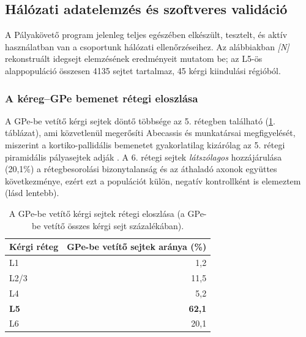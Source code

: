 
\subsection{Hálózati adatelemzés és szoftveres validáció}

A Pályakövető program jelenleg teljes egészében elkészült, tesztelt, és aktív
használatban van a csoportunk hálózati ellenőrzéseihez. Az alábbiakban
\emph{[N]} rekonstruált idegsejt elemzésének eredményeit mutatom be; az L5-ös
alappopuláció összesen 4135 sejtet tartalmaz, 45 kérgi kiindulási régióból.

\subsubsection{A kéreg--GPe bemenet rétegi eloszlása}

A GPe-be vetítő kérgi sejtek döntő többsége az 5. rétegben található
(\ref{tab:retegek}. táblázat), ami közvetlenül megerősíti Abecassis és
munkatársai megfigyelését, miszerint a kortiko-pallidális bemenetet
gyakorlatilag kizárólag az 5. rétegi piramidális pályasejtek adják
\cite{abecassis2020}. A 6. rétegi sejtek \emph{látszólagos} hozzájárulása
(20,1\%) a rétegbesorolási bizonytalanság és az áthaladó axonok együttes
következménye, ezért ezt a populációt külön, negatív kontrollként is
elemeztem (lásd lentebb).

\begin{table}[ht]
\centering
\caption{A GPe-be vetítő kérgi sejtek rétegi eloszlása (a GPe-be vetítő
összes kérgi sejt százalékában).}
\label{tab:retegek}
\begin{tabular}{lr}
\hline
Kérgi réteg & GPe-be vetítő sejtek aránya (\%) \\
\hline
L1    & 1,2 \\
L2/3  & 11,5 \\
L4    & 5,2 \\
\textbf{L5} & \textbf{62,1} \\
L6    & 20,1 \\
\hline
\end{tabular}
\end{table}

